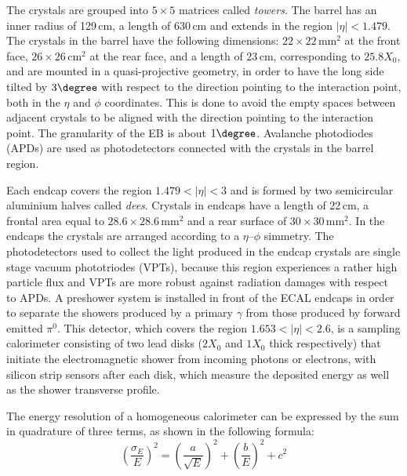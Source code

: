The crystals are grouped into $5\times5$ matrices called \emph{towers}. The barrel has an inner radius of 129\,cm, a length of 630\,cm and extends in the region $|\eta|<1.479$. The crystals in the barrel have the following dimensions: $22\times22\,\mathrm{mm^2}$ at the front face, $26\times26\,\mathrm{cm^2}$ at the rear face, and a length of 23\,cm, corresponding to $25.8 X_0$, and are mounted in a quasi-projective geometry, in order to have the long side tilted by $3\degree$ with respect to the direction pointing to the interaction point, both in the $\eta$ and $\phi$ coordinates. This is done to avoid the empty spaces between adjacent crystals to be aligned with the direction pointing to the interaction point. The granularity of the EB is about $1\degree$.
Avalanche photodiodes (APDs) are used as photodetectors connected with the crystals in the barrel region.

Each endcap covers the region $1.479 < |\eta| < 3$ and is formed by two semicircular aluminium halves called \emph{dees}. Crystals in endcaps have a length of 22\,cm, a frontal area equal to $28.6\times 28.6\,\mathrm{mm^2}$ and a rear surface of $30\times 30\,\mathrm{mm^2}$. In the endcaps the crystals are arranged according to a $\eta$--$\phi$ simmetry. The photodetectors used to collect the light produced in the endcap crystals are single stage vacuum phototriodes (VPTs), because this region experiences a rather high particle flux and VPTs are more robust against radiation damages with respect to APDs. A preshower system is installed in front of the ECAL endcaps in order to separate the showers produced by a primary $\gamma$ from those produced by forward emitted $\pi^0$. This detector, which covers the region $1.653<|\eta|<2.6$, is a sampling calorimeter consisting of two lead disks ($2 X_0$ and $1 X_0$ thick respectively) that initiate the electromagnetic shower from incoming photons or electrons, with silicon strip sensors after each disk, which measure the deposited energy as well as the shower transverse profile.

The energy resolution of a homogeneous calorimeter can be expressed by the sum in quadrature of three terms, as shown in the following formula:
\begin{equation}
\left(\frac{\sigma_E}{E}\right)^2 = \left(\frac{a}{\sqrt{E}}\right)^2 + \left(\frac{b}{E}\right)^2 + c^2
\end{equation}

